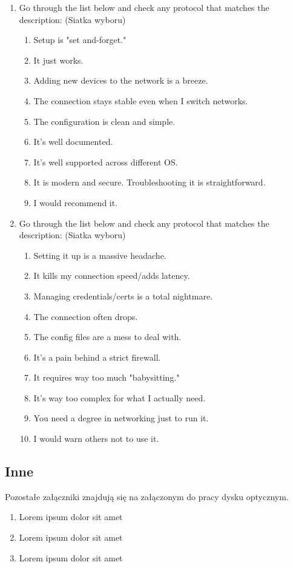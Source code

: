 \begin{enumerate}[leftmargin=*]
    \newpage

    \item Go through the list below and check any protocol that matches the description: (Siatka wyboru)
          \begin{enumerate}[leftmargin=*, label=\alph*)]
              \item Setup is "set and-forget."
              \item It just works.
              \item Adding new devices to the network is a breeze.
              \item The connection stays stable even when I switch networks.
              \item The configuration is clean and simple.
              \item It's well documented.
              \item It's well supported across different OS.
              \item It is modern and secure. Troubleshooting it is straightforward.
              \item I would recommend it.
          \end{enumerate}

    \item Go through the list below and check any protocol that matches the description: (Siatka wyboru)
          \begin{enumerate}[leftmargin=*, label=\alph*)]
            \item Setting it up is a massive headache.
            \item It kills my connection speed/adds latency.
            \item Managing credentials/certs is a total nightmare.
            \item The connection often drops.
            \item The config files are a mess to deal with.
            \item It's a pain behind a strict firewall.
            \item It requires way too much "babysitting."
            \item It's way too complex for what I actually need.
            \item You need a degree in networking just to run it.
            \item I would warn others not to use it.
          \end{enumerate}
\end{enumerate}


\subsection{Inne}

Pozostałe załączniki znajdują się na załączonym do pracy dysku optycznym.

\begin{enumerate}[leftmargin=*]
    \item Lorem ipsum dolor sit amet
    \item Lorem ipsum dolor sit amet
    \item Lorem ipsum dolor sit amet
\end{enumerate}